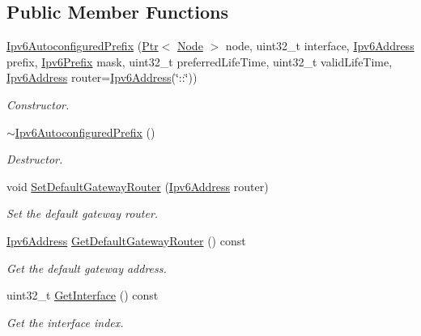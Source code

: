 \subsection*{Public Member Functions}
\begin{DoxyCompactItemize}
\item 
\hyperlink{classns3_1_1Ipv6AutoconfiguredPrefix_af2164ce27d2a518b05f782ad2385c682}{Ipv6\+Autoconfigured\+Prefix} (\hyperlink{classns3_1_1Ptr}{Ptr}$<$ \hyperlink{classns3_1_1Node}{Node} $>$ node, uint32\+\_\+t interface, \hyperlink{classns3_1_1Ipv6Address}{Ipv6\+Address} prefix, \hyperlink{classns3_1_1Ipv6Prefix}{Ipv6\+Prefix} mask, uint32\+\_\+t preferred\+Life\+Time, uint32\+\_\+t valid\+Life\+Time, \hyperlink{classns3_1_1Ipv6Address}{Ipv6\+Address} router=\hyperlink{classns3_1_1Ipv6Address}{Ipv6\+Address}(\char`\"{}\+::\char`\"{}))
\begin{DoxyCompactList}\small\item\em Constructor. \end{DoxyCompactList}\item 
\hyperlink{classns3_1_1Ipv6AutoconfiguredPrefix_a8db6eee3a878cf98abd2be1ec8e4f19e}{$\sim$\+Ipv6\+Autoconfigured\+Prefix} ()
\begin{DoxyCompactList}\small\item\em Destructor. \end{DoxyCompactList}\item 
void \hyperlink{classns3_1_1Ipv6AutoconfiguredPrefix_ac387e1c74009fe7bb959197b8b7bc099}{Set\+Default\+Gateway\+Router} (\hyperlink{classns3_1_1Ipv6Address}{Ipv6\+Address} router)
\begin{DoxyCompactList}\small\item\em Set the default gateway router. \end{DoxyCompactList}\item 
\hyperlink{classns3_1_1Ipv6Address}{Ipv6\+Address} \hyperlink{classns3_1_1Ipv6AutoconfiguredPrefix_a43b1d58c8a4b665d6c5cb4b63bf3025f}{Get\+Default\+Gateway\+Router} () const 
\begin{DoxyCompactList}\small\item\em Get the default gateway address. \end{DoxyCompactList}\item 
uint32\+\_\+t \hyperlink{classns3_1_1Ipv6AutoconfiguredPrefix_a18a381badbc59a067649d202b1f57a85}{Get\+Interface} () const 
\begin{DoxyCompactList}\small\item\em Get the interface index. \end{DoxyCompactList}\item 

\end{DoxyCompactItemize}
